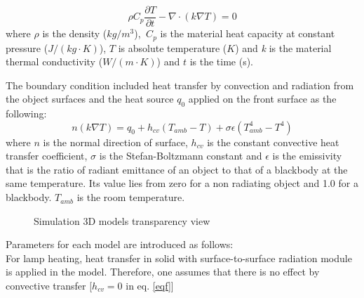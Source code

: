 \documentclass{tQRT2e}
\begin{document}
\begin{equation}
\rho C_p \frac{\partial T}{\partial t}-\nabla \cdot (k\nabla T) = 0
\end{equation}
where $\rho$ is the density (\textit{$kg/m^3$}),   $C_p$ is the material heat capacity at constant pressure ($J/(kg·K)$), $ T $ is absolute temperature ($K$) and \textit{k} is the material thermal conductivity ($W/(m·K)$) and $ t $ is the time (s).

The boundary condition included heat transfer by convection and radiation from the object surfaces and the  heat  source $q_0$  applied on the front surface as the following: 
\begin{equation}
n(k\nabla T) = q_0 + h_{cv}(T_{amb}-T)+\sigma \epsilon(T_{amb}^4-T^4)
\label{eqf}
\end{equation}
where $n$ is the normal direction of surface, $ h_{cv} $ is the constant convective heat transfer coefficient, $\sigma$ is the Stefan-Boltzmann constant  and $\epsilon$ is the emissivity that is the ratio of radiant emittance of an object to that of a blackbody at the same temperature. Its value lies from zero for a non radiating object and 1.0 for a blackbody. $ T_{amb} $ is the room temperature.

\begin{figure}[ht]
    \hspace{-8pt}
    \hspace{-5pt}
	\caption{Simulation 3D models transparency view}
	\label{models}
\end{figure}
Parameters for each model are introduced as follows:\\
For lamp heating, heat transfer in solid with surface-to-surface radiation module is applied in the model. Therefore, one assumes that there is no effect by convective transfer [$h_{cv}=0$ in eq. \ref{eqf}]
\end{document}
